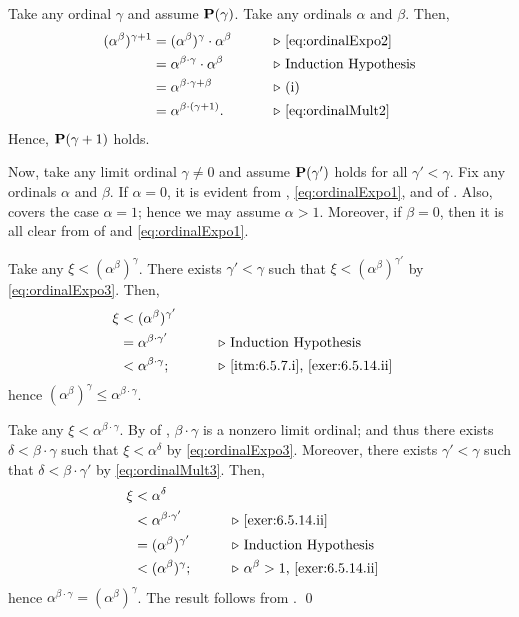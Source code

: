 \documentclass[../introduction_to_set_theory_Note.tex]{subfiles}
\begin{document}
{\begin{enumerate}[nolistsep, label=(\roman*), leftmargin=*, listparindent=\parindent]
    Take any ordinal \(\gamma\) and assume \(\bm{\mathrm{P}}(\gamma)\).
    Take any ordinals \(\alpha\) and \(\beta\). Then,
    \begin{alignat*}{2}
        (\alpha^\beta)^{\gamma + 1}
        &= (\alpha^\beta)^\gamma \cdot \alpha^\beta &\qquad& \comment*{\eqref{eq:ordinalExpo2}} \\
        &= \alpha^{\beta \cdot \gamma} \cdot \alpha^\beta && \comment*{Induction Hypothesis} \\
        &= \alpha^{\beta\cdot \gamma + \beta} && \comment*{(i)} \\
        &= \alpha^{\beta \cdot (\gamma + 1)}. && \comment*{\eqref{eq:ordinalMult2}}
    \end{alignat*}
    Hence, \(\bm{\mathrm{P}}(\gamma + 1)\) holds.

    Now, take any limit ordinal \(\gamma \neq 0\)
    and assume \(\bm{\mathrm{P}}(\gamma')\) holds for all \(\gamma' < \gamma\).
    Fix any ordinals \(\alpha\) and \(\beta\).
    If \(\alpha = 0\), it is evident from ,
    \eqref{eq:ordinalExpo1}, and  of .
    Also,  covers the case \(\alpha = 1\);
    hence we may assume \(\alpha > 1\).
    Moreover, if \(\beta = 0\), then it is all clear from  of 
    and \eqref{eq:ordinalExpo1}.

    Take any \(\xi < (\alpha^\beta)^\gamma\).
    There exists \(\gamma' < \gamma\) such that \(\xi < (\alpha^\beta)^{\gamma'}\)
    by \eqref{eq:ordinalExpo3}.
    Then,
    \begin{alignat*}{2}
        \xi
        &< (\alpha^\beta)^{\gamma'} &\qquad \\
        &= \alpha^{\beta \cdot \gamma'} && \comment*{Induction Hypothesis} \\
        &< \alpha^{\beta \cdot \gamma}; && \comment*{\ref{itm:6.5.7.i}, \ref{exer:6.5.14.ii}}
    \end{alignat*}
    hence \((\alpha^\beta)^\gamma \le \alpha^{\beta \cdot \gamma}\).

    Take any \(\xi < \alpha^{\beta \cdot \gamma}\).
    By  of ,
    \(\beta \cdot \gamma\) is a nonzero limit ordinal;
    and thus there exists \(\delta < \beta \cdot \gamma\)
    such that \(\xi < \alpha^\delta\) by \eqref{eq:ordinalExpo3}.
    Moreover, there exists \(\gamma' < \gamma\)
    such that \(\delta < \beta \cdot \gamma'\) by \eqref{eq:ordinalMult3}. Then,
    \begin{alignat*}{2}
        \xi
        &< \alpha^\delta &\qquad \\
        &< \alpha^{\beta \cdot \gamma'} && \comment*{\ref{exer:6.5.14.ii}} \\
        &= (\alpha^\beta)^{\gamma'} && \comment*{Induction Hypothesis} \\
        &< (\alpha^\beta)^{\gamma}; && \comment*{\(\alpha^\beta > 1\), \ref{exer:6.5.14.ii}}
    \end{alignat*}
    hence \(\alpha^{\beta \cdot \gamma} = (\alpha^\beta)^\gamma\).
    The result follows from .
    \qed
\end{enumerate}
}
\end{document}
